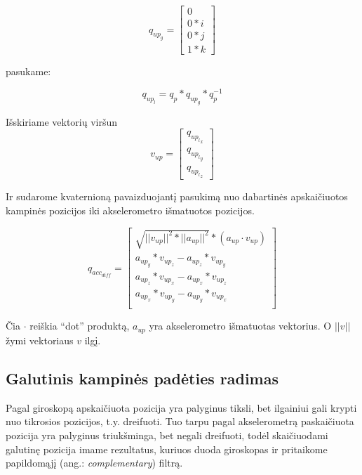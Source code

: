 \documentclass[12pt, a4paper, lithuanian, final]{article}
\begin{document}
\begin{equation}
	q_{up_g} = \left[
		\begin{array}{c}
			0 \\
			0 * i \\
			0 * j \\
			1 * k
		\end{array}
	\right]
\end{equation}

pasukame:

\begin{equation}
	q_{up_l} = q_{p} * q_{up_g} * q_{p}^{-1}
\end{equation}

Išskiriame vektorių viršun
\begin{equation}
	v_{up} = \left[
		\begin{array}{c}
			q_{{up_l}_x} \\
			q_{{up_l}_y} \\
			q_{{up_l}_z}
		\end{array}
	\right]
\end{equation}

Ir sudarome kvaternioną pavaizduojantį pasukimą nuo dabartinės apskaičiuotos kampinės pozicijos iki akselerometro išmatuotos pozicijos.

\begin{equation}
	q_{acc_{diff}} = \left[
		\begin{array}{c}
			\sqrt{ ||v_{up}||^2 * ||a_{up}||^2 } * (a_{up} \cdot v_{up}) \\
			a_{up_y} * v_{up_z} - a_{up_z} * v_{up_y}  \\
			a_{up_z} * v_{up_x} - a_{up_x} * v_{up_z}  \\
			a_{up_x} * v_{up_y} - a_{up_y} * v_{up_x}  \\
		\end{array}
	\right]
\end{equation}

Čia $\cdot$ reiškia "`dot"' produktą, $a_{up}$ yra akselerometro išmatuotas vektorius. O $||v||$ žymi vektoriaus $v$ ilgį.


\subsection{Galutinis kampinės padėties radimas}

Pagal giroskopą apskaičiuota pozicija yra palyginus tiksli, bet ilgainiui gali krypti nuo tikrosios pozicijos, t.y. dreifuoti.
Tuo tarpu pagal akselerometrą paskaičiuota pozicija yra palyginus triukšminga, bet negali dreifuoti, todėl skaičiuodami galutinę pozicija imame rezultatus, kuriuos duoda giroskopas ir pritaikome papildomąjį (ang.: \textit{complementary}) filtrą.
\end{document}
